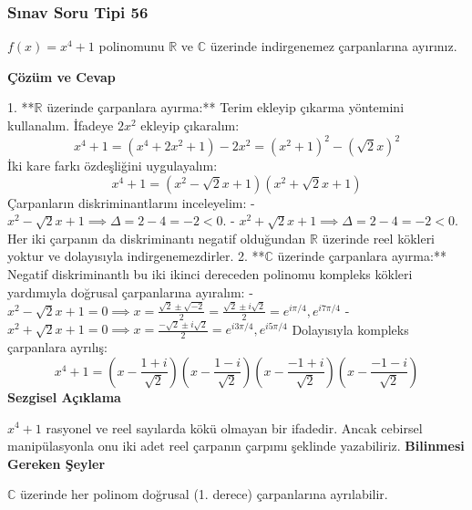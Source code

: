 \documentclass[11pt, a4paper]{article}
\newenvironment{cozum}{
    \vspace{0.5cm}
    \noindent\textcolor{green!60!black}{\faCheckCircle\enspace \textbf{\Large Çözüm ve Cevap}}\par\vspace{0.2cm}
}{}
\newenvironment{sezgisel}{
    \vspace{0.5cm}
    \noindent\textcolor{orange!80!black}{\faLightbulb\enspace \textbf{\Large Sezgisel Açıklama}}\par\vspace{0.2cm}
    \itshape
}{}
\newenvironment{bilgi}{
    \vspace{0.5cm}
    \noindent\textcolor{red!70!black}{\faExclamationTriangle\enspace \textbf{\Large Bilinmesi Gereken Şeyler}}\par\vspace{0.2cm}
}{}
\begin{document}
\subsubsection{Sınav Soru Tipi 56}
\begin{sinavbox}
$f(x) = x^4+1$ polinomunu $\mathbb{R}$ ve $\mathbb{C}$ üzerinde indirgenemez çarpanlarına ayırınız.
\end{sinavbox}
\begin{cozum}
1. **$\mathbb{R}$ üzerinde çarpanlara ayırma:**
   Terim ekleyip çıkarma yöntemini kullanalım. İfadeye $2x^2$ ekleyip çıkaralım:
   \[ x^4 + 1 = (x^4 + 2x^2 + 1) - 2x^2 = (x^2+1)^2 - (\sqrt{2}x)^2 \]
   İki kare farkı özdeşliğini uygulayalım:
   \[ x^4+1 = (x^2 - \sqrt{2}x + 1)(x^2 + \sqrt{2}x + 1) \]
   Çarpanların diskriminantlarını inceleyelim:
   - $x^2 - \sqrt{2}x + 1 \implies \Delta = 2 - 4 = -2 < 0$.
   - $x^2 + \sqrt{2}x + 1 \implies \Delta = 2 - 4 = -2 < 0$.
   Her iki çarpanın da diskriminantı negatif olduğundan $\mathbb{R}$ üzerinde reel kökleri yoktur ve dolayısıyla indirgenemezdirler.
2. **$\mathbb{C}$ üzerinde çarpanlara ayırma:**
   Negatif diskriminantlı bu iki ikinci dereceden polinomu kompleks kökleri yardımıyla doğrusal çarpanlarına ayıralım:
   - $x^2 - \sqrt{2}x + 1 = 0 \implies x = \frac{\sqrt{2} \pm \sqrt{-2}}{2} = \frac{\sqrt{2} \pm i\sqrt{2}}{2} = e^{i\pi/4}, e^{i7\pi/4}$
   - $x^2 + \sqrt{2}x + 1 = 0 \implies x = \frac{-\sqrt{2} \pm i\sqrt{2}}{2} = e^{i3\pi/4}, e^{i5\pi/4}$
   Dolayısıyla kompleks çarpanlara ayrılış:
   \[ x^4+1 = \left(x - \frac{1+i}{\sqrt{2}}\right)\left(x - \frac{1-i}{\sqrt{2}}\right)\left(x - \frac{-1+i}{\sqrt{2}}\right)\left(x - \frac{-1-i}{\sqrt{2}}\right) \]
\end{cozum}
\begin{sezgisel}
$x^4+1$ rasyonel ve reel sayılarda kökü olmayan bir ifadedir. Ancak cebirsel manipülasyonla onu iki adet reel çarpanın çarpımı şeklinde yazabiliriz.
\end{sezgisel}
\begin{bilgi}
$\mathbb{C}$ üzerinde her polinom doğrusal (1. derece) çarpanlarına ayrılabilir.
\end{bilgi}

\newpage
\end{document}
